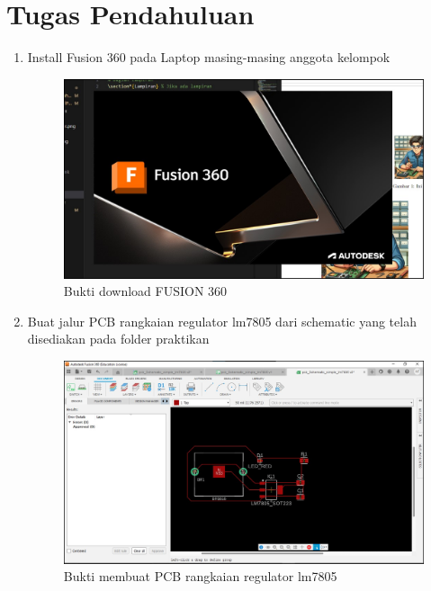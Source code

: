 \section*{Tugas Pendahuluan}
\begin{enumerate}
  \item Install Fusion 360 pada Laptop masing-masing anggota kelompok \\
  \begin{figure}[H]
    \centering
    \includegraphics[width=0.6\linewidth]{img/buktidownloadfusion360.jpg}
    \caption{Bukti download FUSION 360} 
  \end{figure}
  \item Buat jalur PCB rangkaian regulator lm7805 dari schematic yang telah disediakan
  pada folder praktikan \\
  \begin{figure}[H]
    \centering
    \includegraphics[width=0.6\linewidth]{img/buatpcb.jpg}
    \caption{Bukti membuat PCB rangkaian regulator lm7805} 
  \end{figure}
\end{enumerate}